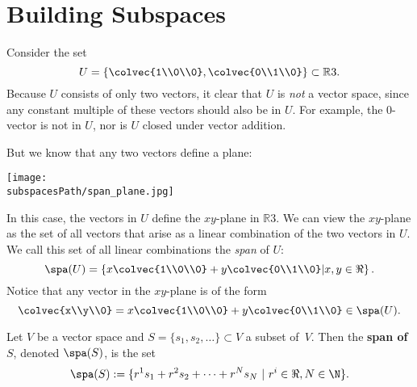 

\section{Building Subspaces}

Consider the set 
\[
U= \left\{ \colvec{1\\0\\0}, \colvec{0\\1\\0} \right\} \subset \mathbb{R}3.
\]
Because $U$ consists of only two vectors, it clear that $U$ is \emph{not} a vector space, since any constant multiple of these vectors should also be in $U$.  For example, the $0$-vector is not in $U$, nor is $U$ closed under vector addition.

But we know that any two vectors define a plane:
\begin{center}
\texttt{[image: \\subspacesPath/span\_plane.jpg]}
\end{center}
 In this case, the vectors in $U$ define the $xy$-plane in $\mathbb{R}3$.  We can view the $xy$-plane as the set of all vectors that arise as a linear combination of the two vectors in $U$.  We call this set of all linear combinations the \emph{span} of $U$:
\[
\spa(U)=\left\{ x \colvec{1\\0\\0}+y \colvec{0\\1\\0} \middle| x,y\in \Re \right\}.
\]
Notice that any vector in the $xy$-plane is of the form
\[
\colvec{x\\y\\0} = x \colvec{1\\0\\0}+y \colvec{0\\1\\0} \in \spa(U).
\]

\begin{definition}
Let $V$ be a vector space and $S=\{ s_1, s_2, \ldots \} \subset V$ a subset of~$V$.  Then the {\bfseries span of $S$}, denoted $\spa(S)$, is the set
\[
\spa(S):=\{ r^1s_1+r^2s_2+\cdots + r^Ns_N ~|~ r^i\in \Re, N\in \N \}.
\]
\end{definition}

